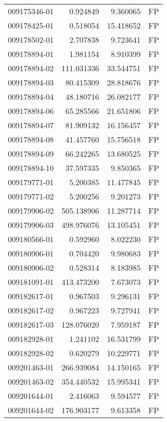 \begin{tabular}{lrrl}
009175346-01 &    0.924849 &     9.360065 &   FP \\
009178425-01 &    0.518054 &    15.418652 &   FP \\
009178502-01 &    2.707838 &     9.723641 &   FP \\
009178894-01 &    1.981154 &     8.910399 &   FP \\
009178894-02 &  111.031336 &    33.544751 &   FP \\
009178894-03 &   80.415309 &    28.818676 &   FP \\
009178894-04 &   48.180716 &    26.082177 &   FP \\
009178894-06 &   65.285566 &    21.651806 &   FP \\
009178894-07 &   81.909132 &    16.156457 &   FP \\
009178894-08 &   41.457760 &    15.756518 &   FP \\
009178894-09 &   66.242265 &    13.680525 &   FP \\
009178894-10 &   37.597335 &     9.850365 &   FP \\
009179771-01 &    5.200385 &    11.477845 &   FP \\
009179771-02 &    5.200256 &     9.201273 &   FP \\
009179906-02 &  505.138906 &    11.287714 &   FP \\
009179906-03 &  498.976076 &    13.105451 &   FP \\
009180566-01 &    0.592960 &     8.022230 &   FP \\
009180906-01 &    0.704420 &     9.980683 &   FP \\
009180906-02 &    0.528314 &     8.183985 &   FP \\
009181091-01 &  413.473200 &     7.673073 &   FP \\
009182617-01 &    0.967503 &     9.296131 &   FP \\
009182617-02 &    0.967223 &     9.727941 &   FP \\
009182617-03 &  128.076020 &     7.959187 &   FP \\
009182928-01 &    1.241102 &    16.531799 &   FP \\
009182928-02 &    0.620279 &    10.229771 &   FP \\
009201463-01 &  266.939084 &    14.150165 &   FP \\
009201463-02 &  354.440532 &    15.995341 &   FP \\
009201644-01 &    2.416063 &     9.594577 &   FP \\
009201644-02 &  176.903177 &     9.613358 &   FP \\

\end{tabular}
